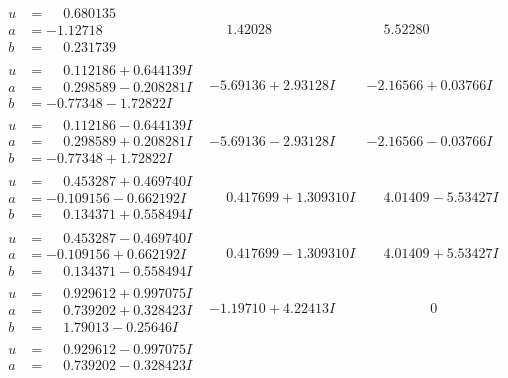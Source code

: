 \documentclass[1p]{elsarticle_modified}
\theoremstyle{definition}
\begin{document}
$$\begin{array}{c|c|c}
\begin{aligned}
u &= \phantom{-}0.680135\phantom{ +0.000000I} \\
a &= -1.12718\phantom{ +0.000000I} \\
b &= \phantom{-}0.231739\phantom{ +0.000000I}\end{aligned}
 & \phantom{-}1.42028\phantom{ +0.000000I} & \phantom{-}5.52280\phantom{ +0.000000I} \\ \hline\begin{aligned}
u &= \phantom{-}0.112186 + 0.644139 I \\
a &= \phantom{-}0.298589 - 0.208281 I \\
b &= -0.77348 - 1.72822 I\end{aligned}
 & -5.69136 + 2.93128 I & -2.16566 + 0.03766 I \\ \hline\begin{aligned}
u &= \phantom{-}0.112186 - 0.644139 I \\
a &= \phantom{-}0.298589 + 0.208281 I \\
b &= -0.77348 + 1.72822 I\end{aligned}
 & -5.69136 - 2.93128 I & -2.16566 - 0.03766 I \\ \hline\begin{aligned}
u &= \phantom{-}0.453287 + 0.469740 I \\
a &= -0.109156 - 0.662192 I \\
b &= \phantom{-}0.134371 + 0.558494 I\end{aligned}
 & \phantom{-}0.417699 + 1.309310 I & \phantom{-}4.01409 - 5.53427 I \\ \hline\begin{aligned}
u &= \phantom{-}0.453287 - 0.469740 I \\
a &= -0.109156 + 0.662192 I \\
b &= \phantom{-}0.134371 - 0.558494 I\end{aligned}
 & \phantom{-}0.417699 - 1.309310 I & \phantom{-}4.01409 + 5.53427 I \\ \hline\begin{aligned}
u &= \phantom{-}0.929612 + 0.997075 I \\
a &= \phantom{-}0.739202 + 0.328423 I \\
b &= \phantom{-}1.79013 - 0.25646 I\end{aligned}
 & -1.19710 + 4.22413 I & \phantom{-0.000000 } 0 \\ \hline\begin{aligned}
u &= \phantom{-}0.929612 - 0.997075 I \\
a &= \phantom{-}0.739202 - 0.328423 I \\

\end{aligned}
\end{array}$$
\end{document}
